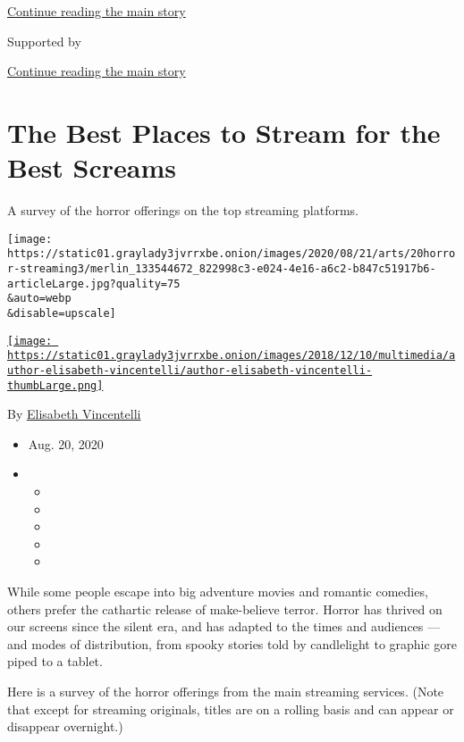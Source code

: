 \protect\hyperlink{after-top}{Continue reading the main story}

Supported by

\protect\hyperlink{after-sponsor}{Continue reading the main story}

\hypertarget{the-best-places-to-stream-for-the-best-screams}{%
\section{The Best Places to Stream for the Best
Screams}\label{the-best-places-to-stream-for-the-best-screams}}

A survey of the horror offerings on the top streaming platforms.

\texttt{[image: https://static01.graylady3jvrrxbe.onion/images/2020/08/21/arts/20horror-streaming3/merlin\_133544672\_822998c3-e024-4e16-a6c2-b847c51917b6-articleLarge.jpg?quality=75\\\&auto=webp\\\&disable=upscale]}

\href{https://www.nytimes3xbfgragh.onion/by/elisabeth-vincentelli}{\texttt{[image: https://static01.graylady3jvrrxbe.onion/images/2018/12/10/multimedia/author-elisabeth-vincentelli/author-elisabeth-vincentelli-thumbLarge.png]}}

By
\href{https://www.nytimes3xbfgragh.onion/by/elisabeth-vincentelli}{Elisabeth
Vincentelli}

\begin{itemize}
\item
  Aug. 20, 2020
\item
  \begin{itemize}
  \item
  \item
  \item
  \item
  \item
  \end{itemize}
\end{itemize}

While some people escape into big adventure movies and romantic
comedies, others prefer the cathartic release of make-believe terror.
Horror has thrived on our screens since the silent era, and has adapted
to the times and audiences --- and modes of distribution, from spooky
stories told by candlelight to graphic gore piped to a tablet.

Here is a survey of the horror offerings from the main streaming
services. (Note that except for streaming originals, titles are on a
rolling basis and can appear or disappear overnight.)

